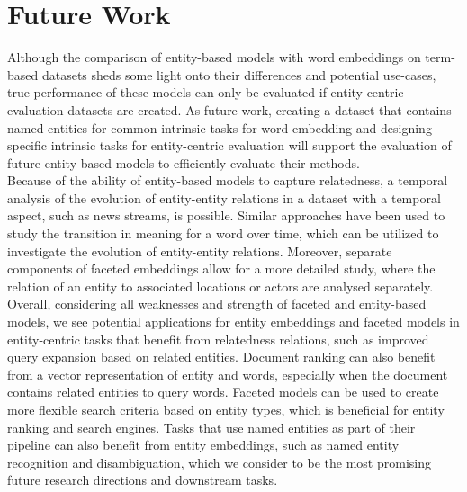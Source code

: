 \section{Future Work}
Although the comparison of entity-based models with word embeddings on term-based datasets sheds some light onto their differences and potential use-cases, true performance of these models can only be evaluated if entity-centric evaluation datasets are created.
As future work, creating a dataset that contains named entities for common intrinsic tasks for word embedding and designing specific intrinsic tasks for entity-centric evaluation will support the evaluation of future entity-based models to efficiently evaluate their methods.\\
Because of the ability of entity-based models to capture relatedness, a temporal analysis of the evolution of entity-entity relations in a dataset with a temporal aspect, such as news streams, is possible. Similar approaches have been used to study the transition in meaning for a word over time, which can be utilized to investigate the evolution of entity-entity relations. Moreover, separate components of faceted embeddings allow for a more detailed study, where the relation of an entity to associated locations or actors are analysed separately. \\
Overall, considering all weaknesses and strength of faceted and entity-based models, we see potential applications for entity embeddings and faceted models in entity-centric tasks that benefit from relatedness relations, such as improved query expansion based on related entities. Document ranking can also benefit from a vector representation of entity and words, especially when the document contains related entities to query words. Faceted models can be used to create more flexible search criteria based on entity types, which is beneficial for entity ranking and search engines. Tasks that use named entities as part of their pipeline can also benefit from entity embeddings, such as named entity recognition and disambiguation, which we consider to be the most promising future research directions and downstream tasks.\\
